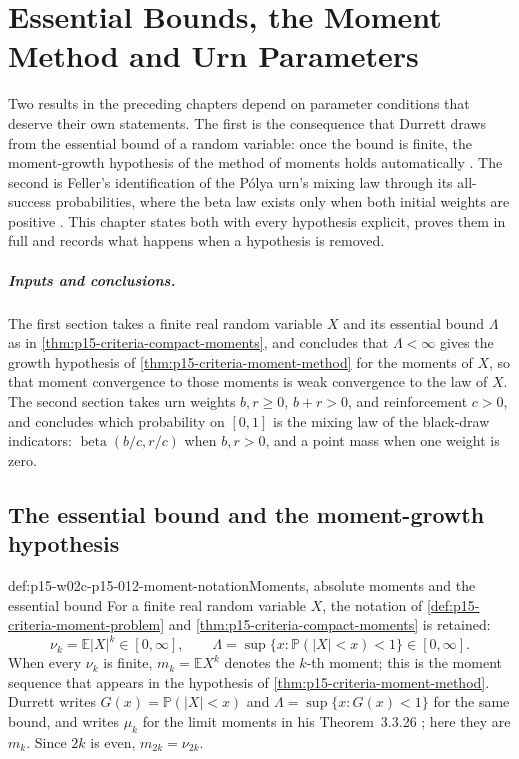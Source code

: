\chapter{Essential Bounds, the Moment Method and Urn Parameters}
\label{sec:p15-w02c-p15-012-bounds-and-urns}

Two results in the preceding chapters depend on parameter conditions that
deserve their own statements. The first is the consequence that Durrett
draws from the essential bound of a random variable: once the bound is
finite, the moment-growth hypothesis of the method of moments holds
automatically \cite[p.~143, Exercise~3.3.24 and Theorem~3.3.26]{DurrettPTEAuthor2019}.
The second is Feller's identification of the P\'olya urn's mixing law
through its all-success probabilities, where the beta law exists only when
both initial weights are positive
\cite[vol.~II, VII.4, pp.~229--230]{Feller1971ProbabilityII}.
This chapter states both with every hypothesis explicit, proves them in
full and records what happens when a hypothesis is removed.

\paragraph{Inputs and conclusions.}
The first section takes a finite real random variable \(X\) and its
essential bound \(\Lambda\) as in
\cref{thm:p15-criteria-compact-moments}, and concludes that
\(\Lambda<\infty\) gives the growth hypothesis of
\cref{thm:p15-criteria-moment-method} for the moments of \(X\), so that
moment convergence to those moments is weak convergence to the law of
\(X\). The second section takes urn weights \(b,r\geq0\), \(b+r>0\), and
reinforcement \(c>0\), and concludes which probability on \([0,1]\) is the
mixing law of the black-draw indicators: \(\operatorname{beta}(b/c,r/c)\)
when \(b,r>0\), and a point mass when one weight is zero.

\section{The essential bound and the moment-growth hypothesis}
\label{sec:p15-w02c-p15-012-essential-bound}

\begin{hbconvention}{def:p15-w02c-p15-012-moment-notation}{Moments, absolute moments and the essential bound}
For a finite real random variable \(X\), the notation of
\cref{def:p15-criteria-moment-problem} and
\cref{thm:p15-criteria-compact-moments} is retained:
\[
 \nu_k=\mathbb E|X|^k\in[0,\infty],\qquad
 \Lambda=\sup\{x:\mathbb P(|X|<x)<1\}\in[0,\infty].
\]
When every \(\nu_k\) is finite, \(m_k=\mathbb EX^k\) denotes the
\(k\)-th moment; this is the moment sequence that appears in the
hypothesis of \cref{thm:p15-criteria-moment-method}.
Durrett writes \(G(x)=\mathbb P(|X|<x)\) and \(\Lambda=\sup\{x:G(x)<1\}\)
for the same bound, and writes \(\mu_k\) for the limit moments in
his Theorem~3.3.26 \cite[p.~143]{DurrettPTEAuthor2019}; here they are
\(m_k\). Since \(2k\) is even, \(m_{2k}=\nu_{2k}\).
\end{hbconvention}

